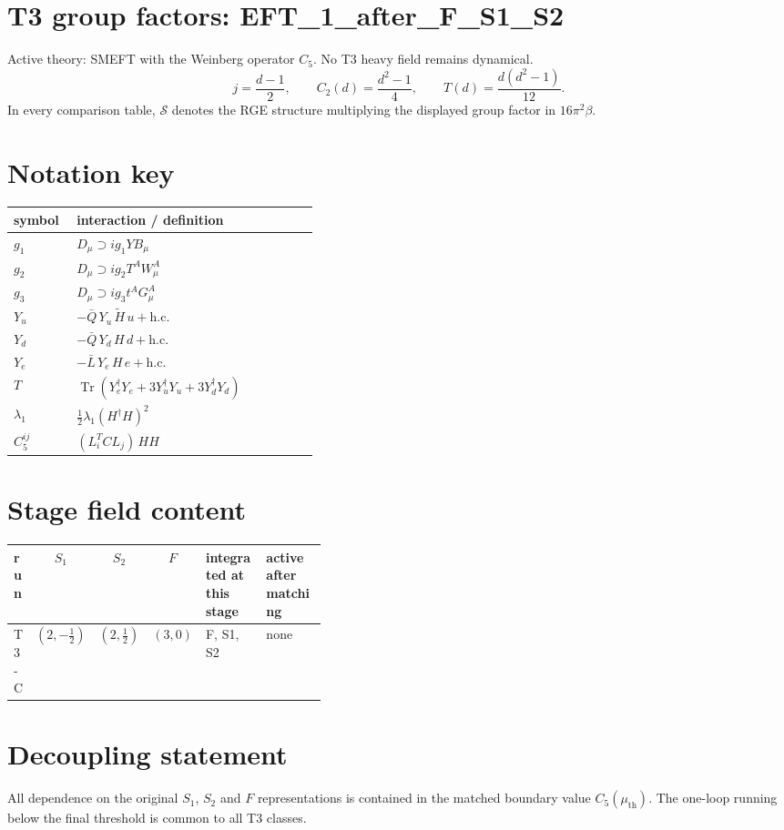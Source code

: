 \documentclass[9pt]{article}
\begin{document}
\section*{T3 group factors: EFT\_1\_after\_F\_S1\_S2}
Active theory: SMEFT with the Weinberg operator $C_5$.  No T3 heavy field remains dynamical.
\[j=\frac{d-1}{2},\qquad C_2(d)=\frac{d^2-1}{4},\qquad T(d)=\frac{d(d^2-1)}{12}.\]
In every comparison table, $\mathcal{S}$ denotes the RGE structure multiplying the displayed group factor in $16\pi^2\beta$.
\section*{Notation key}
\begin{longtable}{@{}p{0.19\linewidth}p{0.73\linewidth}@{}}
\toprule
symbol & interaction / definition \\
\midrule
$g_1$ & $D_\mu\supset i g_1 Y B_\mu$ \\
$g_2$ & $D_\mu\supset i g_2 T^A W_\mu^A$ \\
$g_3$ & $D_\mu\supset i g_3 t^A G_\mu^A$ \\
$Y_u$ & $-\bar Q\,Y_u\,\widetilde H\,u+\mathrm{h.c.}$ \\
$Y_d$ & $-\bar Q\,Y_d\,H\,d+\mathrm{h.c.}$ \\
$Y_e$ & $-\bar L\,Y_e\,H\,e+\mathrm{h.c.}$ \\
$T$ & $\operatorname{Tr}\!\left(Y_e^\dagger Y_e+3Y_u^\dagger Y_u+3Y_d^\dagger Y_d\right)$ \\
$\lambda_1$ & $\frac12\lambda_1(H^\dagger H)^2$ \\
$C_5^{ij}$ & $(L_i^T C L_j)\,H H$ \\
\bottomrule
\end{longtable}
\section*{Stage field content}
\begin{longtable}{@{}lccc p{0.20\linewidth}p{0.20\linewidth}@{}}
\toprule
run & $S_1$ & $S_2$ & $F$ & integrated at this stage & active after matching \\
\midrule
T3-C & $(2,- \frac{1}{2})$ & $(2,\frac{1}{2})$ & $(3,0)$ & F, S1, S2 & none \\
\bottomrule
\end{longtable}
\section*{Decoupling statement}
All dependence on the original $S_1$, $S_2$ and $F$ representations is contained in the matched boundary value $C_5(\mu_{\mathrm{th}})$.  The one-loop running below the final threshold is common to all T3 classes.
\end{document}
